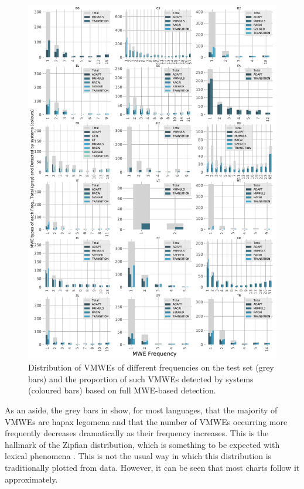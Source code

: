 \documentclass[output=paper,modfonts,nonflat,draftmode]{langsci/langscibook}
\begin{document}
\begin{figure}
\includegraphics[scale=0.48]{figures/matched-mwes.pdf}
\caption{\label{fig:matched-mwes}Distribution of VMWEs of different frequencies on the test set (grey bars) and the proportion of such VMWEs detected by systems (coloured bars) based on full MWE-based detection.}
\end{figure}

As an aside, the grey bars in  show, for most languages, that the majority of VMWEs are hapax legomena and that the number of VMWEs occurring more frequently decreases dramatically as their frequency increases. This is the hallmark of the Zipfian distribution, which is something to be expected with lexical phenomena \citep[pp.~22--6]{Manning}. This is not the usual way in which this distribution is traditionally plotted from data. However, it can be seen that most charts follow it approximately.
\end{document}
